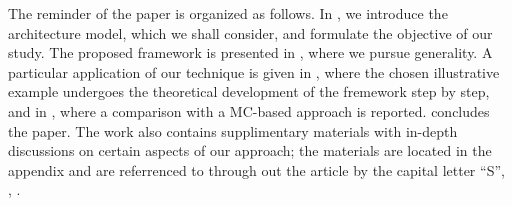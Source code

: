 The reminder of the paper is organized as follows. In , we introduce the architecture model, which we shall consider, and formulate the objective of our study. The proposed framework is presented in , where we pursue generality. A particular application of our technique is given in , where the chosen illustrative example undergoes the theoretical development of the fremework step by step, and in , where a comparison with a MC-based approach is reported.  concludes the paper. The work also contains supplimentary materials with in-depth discussions on certain aspects of our approach; the materials are located in the appendix and are referrenced to through out the article by the capital letter ``S'', \eg, .
